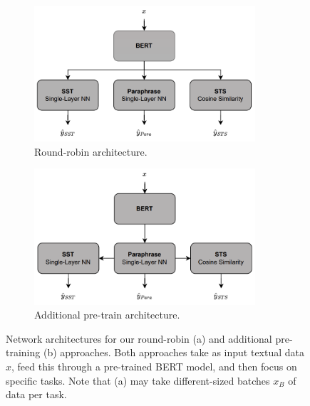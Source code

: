 \documentclass{article}
\begin{document}
\begin{figure}[h]
    \centering
    \begin{subfigure}[H]{0.49\textwidth}
    \includegraphics[width=0.9\textwidth,valign=t]{writeup/round-robin.png}
        \footnotesize
        \caption{Round-robin architecture.}
        \label{fig: vacc-rate}
    \end{subfigure}
    \begin{subfigure}[H]{0.49\textwidth}
    \includegraphics[width=0.9\textwidth,valign=t]{writeup/add-pretrain.png}
        \footnotesize
        \caption{Additional pre-train architecture.}
        \label{fig: sia-eff}
    \end{subfigure}
    \caption{Network architectures for our round-robin (a) and additional pre-training (b) approaches. Both approaches take as input textual data $x$, feed this through a pre-trained BERT model, and then focus on specific tasks. Note that (a) may take different-sized batches $x_B$ of data per task.}
    \label{fig: round-robin-arch}
\end{figure}
\vspace{-0.2cm}
\end{document}
